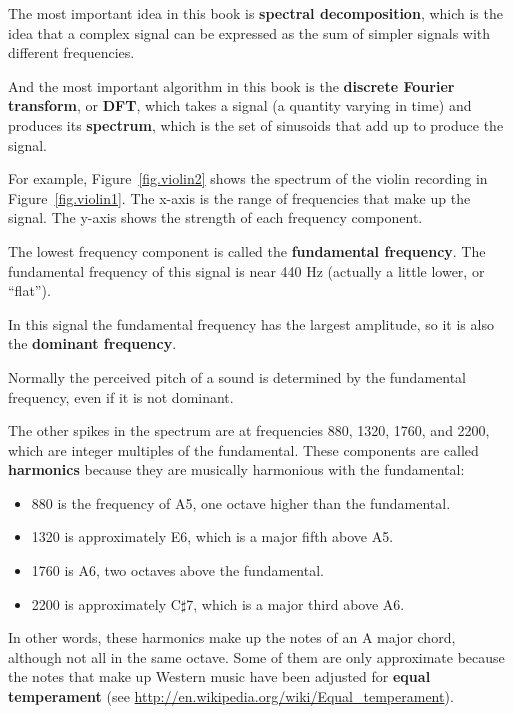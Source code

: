 \documentclass[12pt]{book}
\begin{document}
The most important idea in this book is {\bf spectral decomposition},
which is the idea that a complex signal can be expressed as the sum of
simpler signals with different frequencies.

And the most important algorithm in this book is the {\bf discrete
  Fourier transform}, or {\bf DFT}, which takes a signal (a quantity
varying in time) and produces its {\bf spectrum}, which is the set of
sinusoids that add up to produce the signal.

For example, Figure~\ref{fig.violin2} shows the spectrum of the violin
recording in Figure~\ref{fig.violin1}.  The x-axis is the range of
frequencies that make up the signal.  The y-axis shows the strength of
each frequency component.

The lowest frequency component is called the {\bf fundamental
  frequency}.  The fundamental frequency of this signal is near 440 Hz
(actually a little lower, or ``flat'').

In this signal the fundamental frequency has the largest amplitude,
so it is also the {\bf dominant frequency}.

Normally the perceived pitch of a sound is determined by the
fundamental frequency, even if it is not dominant. 

The other spikes in the spectrum are at frequencies 880, 1320, 1760, and
2200, which are integer multiples of the fundamental.
These components are called {\bf harmonics} because they are
musically harmonious with the fundamental:

\begin{itemize}

\item 880 is the frequency of
A5, one octave higher than the fundamental.  

\item 1320 is approximately E6, which is a major fifth above A5.

\item 1760 is A6, two octaves above the fundamental. 

\item 2200 is approximately C$\sharp$7, which is a major third
above A6.

\end{itemize}

In other words, these harmonics make up the notes of an A major
chord, although not all in the same octave.  Some of them are only
approximate because the notes that make up Western music have been
adjusted for {\bf equal temperament} (see
 \url{http://en.wikipedia.org/wiki/Equal_temperament}).
\end{document}
